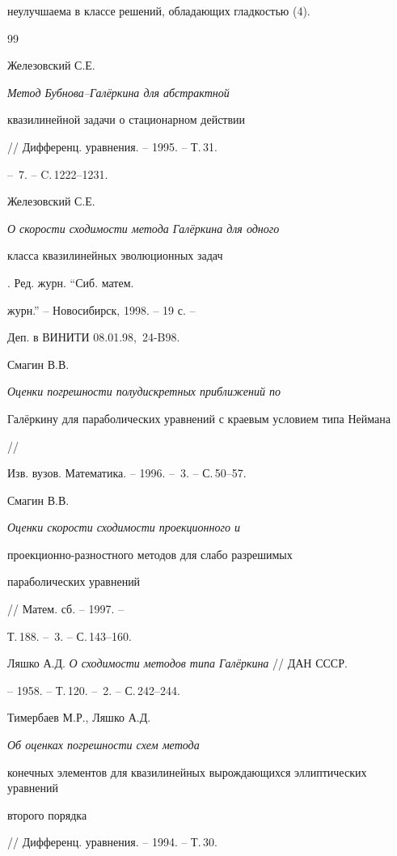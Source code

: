 неулучшаема в классе решений, обладающих гладкостью (4).





\begin{thebibliography}{99}







Железовский С.Е. {\em Метод Бубнова--Гал\"еркина для абстрактной


 квазилинейной задачи о стационарном действии}


// Дифференц. уравнения. -- 1995. -- Т.\,31.


-- \No\,7. -- C.\,1222--1231.




Железовский С.Е. {\em О скорости сходимости метода Гал\"еркина для одного


класса квазилинейных эволюционных задач}. Ред. журн. ``Сиб. матем.


журн.'' -- Новосибирск, 1998. -- 19 с. --


Деп. в ВИНИТИ 08.01.98, \No\,24-B98.




Смагин В.В. {\em Оценки погрешности полудискретных приближений по


Гал\"еркину для параболических уравнений с краевым условием типа Неймана} //


Изв. вузов.  Математика. -- 1996. -- \No\,3. -- С.\,50--57.




Смагин В.В. {\em Оценки скорости сходимости проекционного и


проекционно-разностного методов для слабо разрешимых


 параболических уравнений} // Матем. сб. -- 1997. --


Т.\,188. -- \No\,3. -- С.\,143--160.




Ляшко А.Д. {\em О сходимости методов типа Гал\"еркина} // ДАН СССР.


-- 1958. -- Т.\,120. -- \No\,2. -- С.\,242--244.




Тимербаев М.Р., Ляшко А.Д. {\em Об оценках погрешности схем метода


конечных элементов для квазилинейных вырождающихся эллиптических уравнений


второго порядка} // Дифференц. уравнения. -- 1994. -- Т.\,30.



\end{thebibliography}
